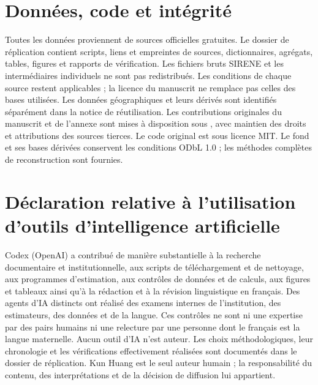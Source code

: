 \section*{Données, code et intégrité}
Toutes les données proviennent de sources officielles gratuites. Le dossier de réplication contient scripts, liens et empreintes de sources, dictionnaires, agrégats, tables, figures et rapports de vérification. Les fichiers bruts SIRENE et les intermédiaires individuels ne sont pas redistribués. Les conditions de chaque source restent applicables ; la licence du manuscrit ne remplace pas celles des bases utilisées. Les données géographiques et leurs dérivés sont identifiés séparément dans la notice de réutilisation. Les contributions originales du manuscrit et de l’annexe sont mises à disposition sous , avec maintien des droits et attributions des sources tierces. Le code original est sous licence MIT. Le fond  et ses bases dérivées conservent les conditions ODbL 1.0 ; les méthodes complètes de reconstruction sont fournies.

\section*{Déclaration relative à l’utilisation d’outils d’intelligence artificielle}
Codex (OpenAI) a contribué de manière substantielle à la recherche documentaire et institutionnelle, aux scripts de téléchargement et de nettoyage, aux programmes d’estimation, aux contrôles de données et de calculs, aux figures et tableaux ainsi qu’à la rédaction et à la révision linguistique en français. Des agents d’IA distincts ont réalisé des examens internes de l’institution, des estimateurs, des données et de la langue. Ces contrôles ne sont ni une expertise par des pairs humains ni une relecture par une personne dont le français est la langue maternelle. Aucun outil d’IA n’est auteur. Les choix méthodologiques, leur chronologie et les vérifications effectivement réalisées sont documentés dans le dossier de réplication. Kun Huang est le seul auteur humain ; la responsabilité du contenu, des interprétations et de la décision de diffusion lui appartient.




